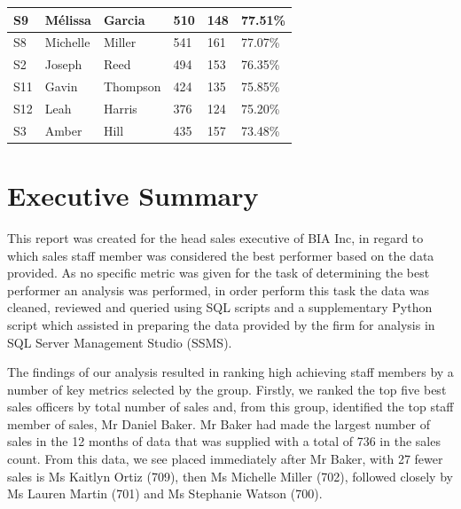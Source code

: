 \documentclass{article}
\begin{document}
\begin{table}[H]
\begin{tabular}{|l|l|l|l|l|l|}
                S9      & Mélissa        & Garcia       & 510              & 148            & 77.51\%               \\ \hline
                S8      & Michelle       & Miller       & 541              & 161            & 77.07\%               \\ \hline
                S2      & Joseph         & Reed         & 494              & 153            & 76.35\%               \\ \hline
                S11     & Gavin          & Thompson     & 424              & 135            & 75.85\%               \\ \hline
                S12     & Leah           & Harris       & 376              & 124            & 75.20\%               \\ \hline
                S3      & Amber          & Hill         & 435              & 157            & 73.48\%               \\ \hline
                \end{tabular}
            \end{table}
    \newpage
    \section{Executive Summary}
    This report was created for the head sales executive of BIA Inc, 
    in regard to which sales staff member was considered the best performer 
    based on the data provided. As no specific metric was given for the task 
    of determining the best performer an analysis was performed, in order 
    perform this task the data was cleaned, reviewed and queried using
    SQL scripts and a supplementary Python script which assisted in
    preparing the data provided by the firm for analysis in SQL Server Management Studio
    (SSMS).
    \vspace{5mm}
    \par\noindent
    
    \noindent The findings of our analysis resulted in ranking high achieving staff
    members by a number of key metrics selected by the group. Firstly, we ranked the
    top five best sales officers by total number of sales and, from this group, identified 
    the top staff member of sales, Mr Daniel Baker. Mr Baker had made the
    largest number of sales in the 12 months of data that was supplied with a total of 736
    in the sales count. From this data, we see placed immediately after Mr Baker, with 27
    fewer sales is Ms Kaitlyn Ortiz (709), then Ms Michelle Miller (702), followed closely
    by Ms Lauren Martin (701) and Ms Stephanie Watson (700).
    \vspace{5mm}
    \par\noindent
    
\end{document}
